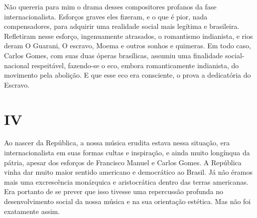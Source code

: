 Não quereria para mim o drama desses compositores profanos da fase
internacionalista. Esforços graves eles fizeram, e o que é pior, nada
compensadores, para adquirir uma realidade social mais legítima e
brasileira. Refletiram nesse esforço, ingenuamente atrasados, o
romantismo indianista, e rios deram O Guarani, O escravo, Moema e outros
sonhos e quimeras. Em todo caso, Carlos Gomes, com suas duas óperas
brasílicas, assumiu uma finalidade social-nacional respeitável,
fazendo-se o eco, embora romanticamente indianista, do movimento pela
abolição. E que esse eco era consciente, o prova a dedicatória do
Escravo.

\section{IV}

Ao nascer da República, a nossa música erudita estava nessa situação,
era internacionalista em suas formas cultas e inspiração, e ainda muito
longínqua da pátria, apesar dos esforços de Francisco Manuel e Carlos
Gomes. A República vinha dar muito maior sentido americano e democrático
ao Brasil. Já não éramos mais uma excrescência monárquica e
aristocrática dentro das terras americanas. Era portanto de se prever
que isso tivesse uma repercussão profunda no desenvolvimento social da
nossa música e na sua orientação estética. Mas não foi exatamente assim.


